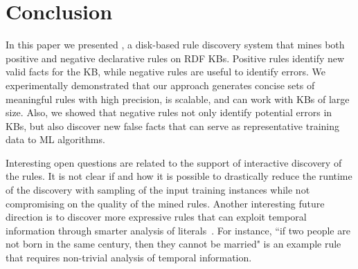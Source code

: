 \section{Conclusion}

In this paper we presented \krd, a disk-based rule discovery system that mines both positive and negative declarative rules on RDF KBs. Positive rules identify new valid facts for the KB, while negative rules are useful to identify errors. 
We experimentally demonstrated that our approach generates concise sets of meaningful rules with high precision,
is scalable, and can work with KBs of large size. 
Also, we showed that negative rules not only identify potential errors in KBs, but also discover new false facts that can serve as representative training data to ML algorithms.

Interesting open questions are related to the support of interactive discovery of the rules. It is not clear if and how it is possible to drastically reduce the runtime of the discovery with sampling of the input training instances while not compromising on the quality of the mined rules. 
Another interesting future direction is to discover more expressive rules that can exploit temporal information through smarter analysis of literals~\cite{abedjan2015temporal}. For instance, ``if two people are not born in the same century, then they cannot be married" is an example rule that requires non-trivial analysis of temporal information. 


